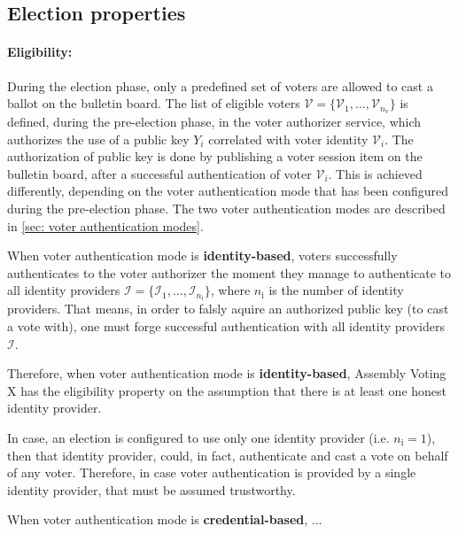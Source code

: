 \subsection{Election properties} \label{sec: election properties}


\paragraph{Eligibility:}
During the election phase, only a predefined set of voters are allowed to cast a ballot on the bulletin board. The list of eligible voters $\boldsymbol{\mathcal{V}} = \{ \mathcal{V}_1, ..., \mathcal{V}_{n_\mathrm{v}} \}$ is defined, during the pre-election phase, in the voter authorizer service, which authorizes the use of a public key $Y_i$ correlated with voter identity $\mathcal{V}_i$. The authorization of public key is done by publishing a voter session item on the bulletin board, after a successful authentication of voter $\mathcal{V}_i$. This is achieved differently, depending on the voter authentication mode that has been configured during the pre-election phase. The two voter authentication modes are described in \cref{sec: voter authentication modes}.

When voter authentication mode is \textbf{identity-based}, voters successfully authenticates to the voter authorizer the moment they manage to authenticate to all identity providers $\boldsymbol{\mathcal{I}} = \{ \mathcal{I}_1, ..., \mathcal{I}_{n_\mathrm{i}} \}$, where $n_\mathrm{i}$ is the number of identity providers. That means, in order to falsly aquire an authorized public key (to cast a vote with), one must forge successful authentication with all identity providers $\boldsymbol{\mathcal{I}}$.

Therefore, when voter authentication mode is \textbf{identity-based}, Assembly Voting X has the eligibility property on the assumption that there is at least one honest identity provider.

In case, an election is configured to use only one identity provider (i.e. $n_\mathrm{i} = 1$), then that identity provider, could, in fact, authenticate and cast a vote on behalf of any voter. Therefore, in case voter authentication is provided by a single identity provider, that must be assumed trustworthy.

When voter authentication mode is \textbf{credential-based}, ...


